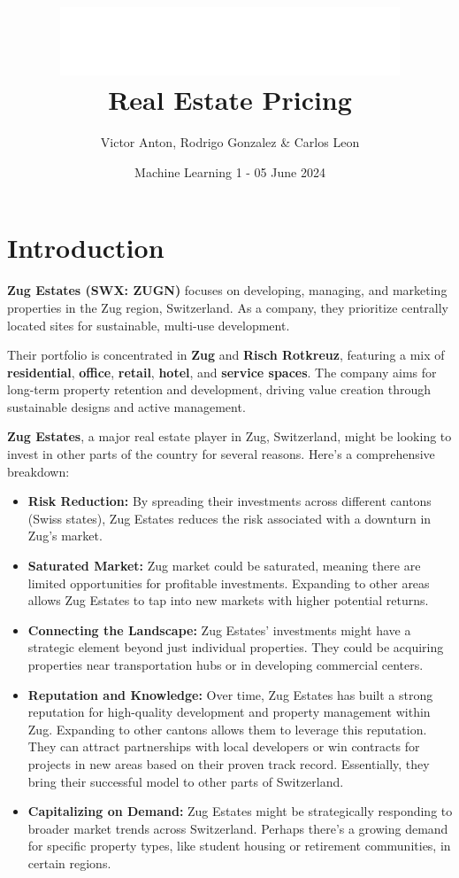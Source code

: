 \documentclass[
]{article}
\title{\includegraphics[width=4in,height=\textheight]{images/LogoZugEstates.png}\\
Real Estate Pricing}
\author{Victor Anton, Rodrigo Gonzalez \& Carlos Leon}
\date{Machine Learning 1 - 05 June 2024}
\begin{document}
\maketitle

{
\setcounter{tocdepth}{3}
\tableofcontents
}
\section{Introduction}\label{introduction}

\textbf{Zug Estates (SWX: ZUGN)} focuses on developing, managing, and
marketing properties in the Zug region, Switzerland. As a company, they
prioritize centrally located sites for sustainable, multi-use
development.

Their portfolio is concentrated in \textbf{Zug} and \textbf{Risch
Rotkreuz}, featuring a mix of \textbf{residential}, \textbf{office},
\textbf{retail}, \textbf{hotel}, and \textbf{service spaces}. The
company aims for long-term property retention and development, driving
value creation through sustainable designs and active management.

\textbf{Zug Estates}, a major real estate player in Zug, Switzerland,
might be looking to invest in other parts of the country for several
reasons. Here's a comprehensive breakdown:

\begin{itemize}
\item
  \textbf{Risk Reduction:} By spreading their investments across
  different cantons (Swiss states), Zug Estates reduces the risk
  associated with a downturn in Zug's market.
\item
  \textbf{Saturated Market:} Zug market could be saturated, meaning
  there are limited opportunities for profitable investments. Expanding
  to other areas allows Zug Estates to tap into new markets with higher
  potential returns.
\item
  \textbf{Connecting the Landscape:} Zug Estates' investments might have
  a strategic element beyond just individual properties. They could be
  acquiring properties near transportation hubs or in developing
  commercial centers.
\item
  \textbf{Reputation and Knowledge:} Over time, Zug Estates has built a
  strong reputation for high-quality development and property management
  within Zug. Expanding to other cantons allows them to leverage this
  reputation. They can attract partnerships with local developers or win
  contracts for projects in new areas based on their proven track
  record. Essentially, they bring their successful model to other parts
  of Switzerland.
\item
  \textbf{Capitalizing on Demand:} Zug Estates might be strategically
  responding to broader market trends across Switzerland. Perhaps
  there's a growing demand for specific property types, like student
  housing or retirement communities, in certain regions.
\end{itemize}
\end{document}

